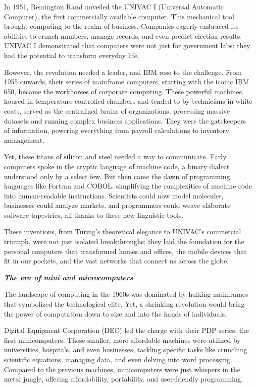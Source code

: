 \documentclass[
  letterpaper,
  DIV=11,
  numbers=noendperiod]{scrreprt}
\begin{document}
In 1951, Remington Rand unveiled the UNIVAC I (Universal Automatic
Computer), the first commercially available computer. This mechanical
tool brought computing to the realm of business. Companies eagerly
embraced its abilities to crunch numbers, manage records, and even
predict election results. UNIVAC I demonstrated that computers were not
just for government labs; they had the potential to transform everyday
life.

However, the revolution needed a leader, and IBM rose to the challenge.
From 1955 onwards, their series of mainframe computers, starting with
the iconic IBM 650, became the workhorses of corporate computing. These
powerful machines, housed in temperature-controlled chambers and tended
to by technicians in white coats, served as the centralized brains of
organizations, processing massive datasets and running complex business
applications. They were the gatekeepers of information, powering
everything from payroll calculations to inventory management.

Yet, these titans of silicon and steel needed a way to communicate.
Early computers spoke in the cryptic language of machine code, a binary
dialect understood only by a select few. But then came the dawn of
programming languages like Fortran and COBOL, simplifying the
complexities of machine code into human-readable instructions.
Scientists could now model molecules, businesses could analyze markets,
and programmers could weave elaborate software tapestries, all thanks to
these new linguistic tools.

These inventions, from Turing's theoretical elegance to UNIVAC's
commercial triumph, were not just isolated breakthroughs; they laid the
foundation for the personal computers that transformed homes and
offices, the mobile devices that fit in our pockets, and the vast
networks that connect us across the globe.

\textbf{\emph{The era of mini and microcomputers}}

The landscape of computing in the 1960s was dominated by hulking
mainframes that symbolized the technological elite. Yet, a shrinking
revolution would bring the power of computation down to size and into
the hands of individuals.

Digital Equipment Corporation (DEC) led the charge with their PDP
series, the first minicomputers. These smaller, more affordable machines
were utilized by universities, hospitals, and even businesses, tackling
specific tasks like crunching scientific equations, managing data, and
even delving into word processing. Compared to the previous machines,
minicomputers were just whispers in the metal jungle, offering
affordability, portability, and user-friendly programming.
\end{document}

